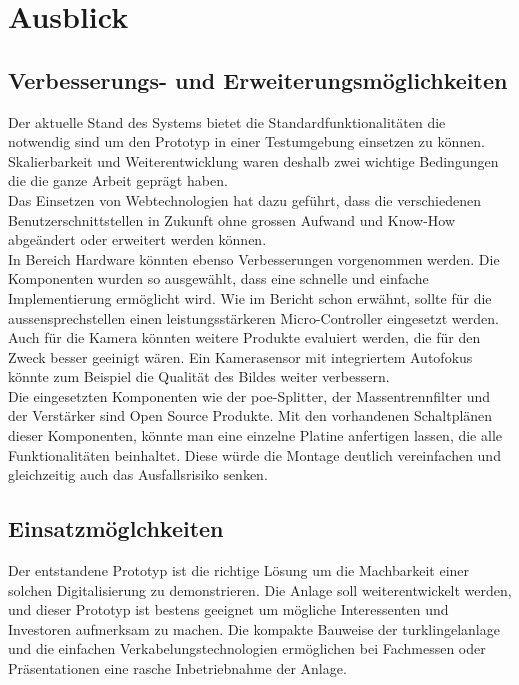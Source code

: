 \section{Ausblick}
\label{sec:ausblick}
\subsection{Verbesserungs- und Erweiterungsmöglichkeiten}
\label{sec:erweiterungen}
Der aktuelle Stand des Systems bietet die Standardfunktionalitäten die notwendig sind um den Prototyp in einer Testumgebung einsetzen zu können. Skalierbarkeit und Weiterentwicklung waren deshalb zwei wichtige Bedingungen die die ganze Arbeit geprägt haben.
\\
Das Einsetzen von Webtechnologien hat dazu geführt, dass die verschiedenen Benutzerschnittstellen in Zukunft ohne grossen Aufwand und Know-How abgeändert oder erweitert werden können.
\\
In Bereich Hardware könnten ebenso Verbesserungen vorgenommen werden. Die Komponenten wurden so ausgewählt, dass eine schnelle und einfache Implementierung ermöglicht wird. Wie im Bericht schon erwähnt, sollte für die \gls{aussensprechstelle}n einen leistungsstärkeren Micro-Controller eingesetzt werden. Auch für die Kamera könnten weitere Produkte evaluiert werden, die für den Zweck besser geeinigt wären. Ein Kamerasensor mit integriertem Autofokus könnte zum Beispiel die Qualität des Bildes weiter verbessern.
\\
Die eingesetzten Komponenten wie der \gls{poe}-Splitter, der Massentrennfilter und der Verstärker sind Open Source Produkte. Mit den vorhandenen Schaltplänen dieser Komponenten, könnte man eine einzelne Platine anfertigen lassen, die alle Funktionalitäten beinhaltet. Diese würde die Montage deutlich vereinfachen und gleichzeitig auch das Ausfallsrisiko senken.
\\

\subsection{Einsatzmöglchkeiten}
\label{sec:eisatz}
Der entstandene Prototyp ist die richtige Lösung um die Machbarkeit einer solchen Digitalisierung zu demonstrieren. Die Anlage soll weiterentwickelt werden, und dieser Prototyp ist bestens geeignet um mögliche Interessenten und Investoren aufmerksam zu machen. Die kompakte Bauweise der \gls{turklingelanlage} und die einfachen Verkabelungstechnologien ermöglichen bei Fachmessen oder Präsentationen eine rasche Inbetriebnahme der Anlage.

